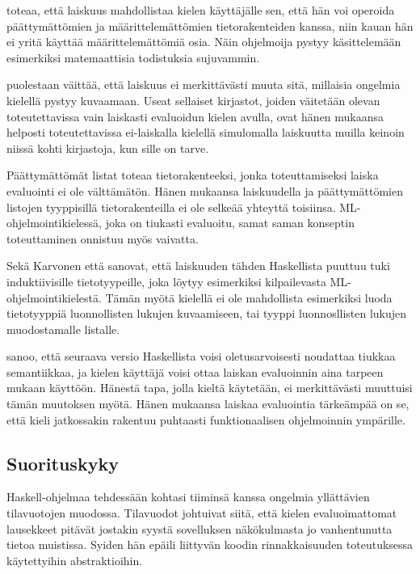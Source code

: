 \citet{haskellwikilaziness} toteaa, että laiskuus mahdollistaa kielen käyttäjälle sen, että hän voi operoida päättymättömien ja määrittelemättömien tietorakenteiden kanssa, niin kauan hän ei yritä käyttää määrittelemättömiä osia. Näin ohjelmoija pystyy käsittelemään esimerkiksi matemaattisia todistuksia sujuvammin.

\citet{vesakarvonen} puolestaan väittää, että laiskuus ei merkittävästi muuta sitä, millaisia ongelmia kielellä pystyy kuvaamaan. Useat sellaiset kirjastot, joiden väitetään olevan toteutettavissa vain laiskasti evaluoidun kielen avulla, ovat hänen mukaansa helposti toteutettavissa ei-laiskalla kielellä simulomalla laiskuutta muilla keinoin niissä kohti kirjastoja, kun sille on tarve.

Päättymättömät listat \citet{pointoflaziness} toteaa tietorakenteeksi, jonka toteuttamiseksi laiska evaluointi ei ole välttämätön. Hänen mukaansa laiskuudella ja päättymättömien listojen tyyppisillä tietorakenteilla ei ole selkeää yhteyttä toisiinsa. ML-ohjelmointikielessä, joka on tiukasti evaluoitu, samat saman konseptin toteuttaminen onnistuu myös vaivatta.

Sekä Karvonen että \citet{pointoflaziness} sanovat, että laiskuuden tähden Haskellista puuttuu tuki induktiivisille tietotyypeille, joka löytyy esimerkiksi kilpailevasta ML-ohjelmointikielestä. Tämän myötä kielellä ei ole mahdollista esimerkiksi luoda tietotyyppiä luonnollisten lukujen kuvaamiseen, tai tyyppi luonnosllisten lukujen muodostamalle listalle.

\citet{jonesretrospectiveonhaskell} sanoo, että seuraava versio Haskellista voisi oletusarvoisesti noudattaa tiukkaa semantiikkaa, ja kielen käyttäjä voisi ottaa laiskan evaluoinnin aina tarpeen mukaan käyttöön. Hänestä tapa, jolla kieltä käytetään, ei merkittävästi muuttuisi tämän muutoksen myötä. Hänen mukaansa laiskaa evaluointia tärkeämpää on se, että kieli jatkossakin rakentuu puhtaasti funktionaalisen ohjelmoinnin ympärille.

\subsection{Suorituskyky}

Haskell-ohjelmaa tehdessään \citet{sampson2009experience} kohtasi tiiminsä kanssa ongelmia yllättävien tilavuotojen muodossa. Tilavuodot johtuivat siitä, että kielen evaluoimattomat lausekkeet pitävät jostakin syystä sovelluksen näkökulmasta jo vanhentunutta tietoa muistissa. Syiden hän epäili liittyvän koodin rinnakkaisuuden toteutuksessa käytettyihin abstraktioihin.

